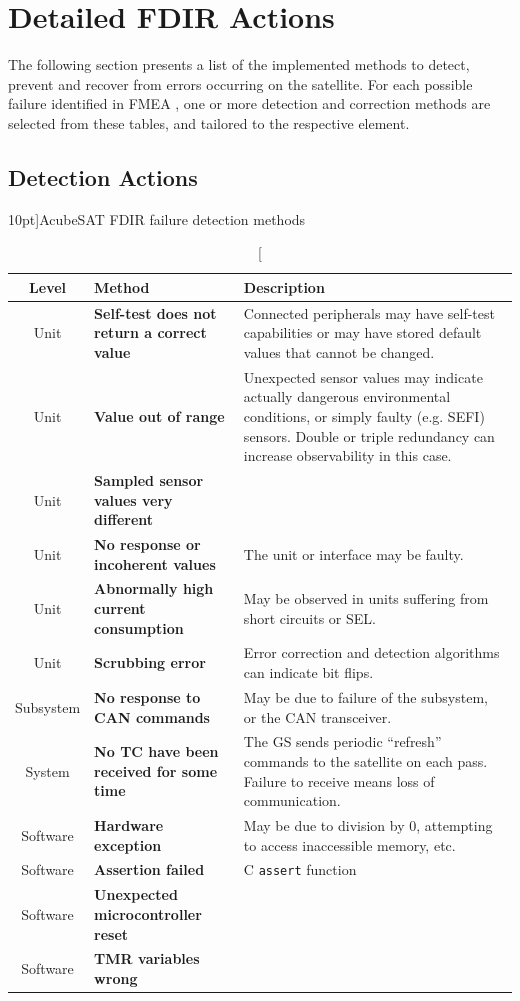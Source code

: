 \documentclass[a4paper,nobib]{tufte-book}
\begin{document}
\FloatBarrier
\section{Detailed \acs{FDIR} Actions}

The following section presents a list of the implemented methods to detect, prevent and recover from errors occurring on the satellite. For each possible failure identified in \acs{FMEA} \autocite{retselis_acubesat_fmea_2020}, one or more detection and correction methods are selected from these tables, and tailored to the respective element.


\clearpage
\subsection{Detection Actions}
\begin{table}[h]
	\centering
	\caption[][10pt]{AcubeSAT \acs{FDIR} failure detection methods}
	\label{tab:fdir_detect}
	\renewcommand{\arraystretch}{1.3}
	\begin{tabularx}{\textwidth}{@{}cL{5cm}X@{}}
		\toprule
		Level & Method & Description \\ \midrule
		Unit & \textbf{Self-test does not return a correct value} & Connected peripherals may have self-test capabilities or may have stored default values that cannot be changed. \\
		Unit & \textbf{Value out of range} & Unexpected sensor values may indicate actually dangerous environmental conditions, or simply faulty (e.g. \acs{SEFI}) sensors. Double or triple redundancy can increase observability in this case. \\
		Unit & \textbf{Sampled sensor values very different} & \\
		Unit & \textbf{No response or incoherent values} & The unit or interface may be faulty. \\
		Unit & \textbf{Abnormally high current consumption} & May be observed in units suffering from short circuits or \acs{SEL}. \\
		Unit & \textbf{Scrubbing error} & Error correction and detection algorithms can indicate bit flips. \\
		Subsystem & \textbf{No response to \acs{CAN} commands} & May be due to failure of the subsystem, or the \acs{CAN} transceiver. \\
		System & \textbf{No \acs{TC} have been received for some time} & The \acs{GS} sends periodic ``refresh'' commands to the satellite on each pass. Failure to receive means loss of communication. \\
		Software & \textbf{Hardware exception} & May be due to division by 0, attempting to access inaccessible memory, etc. \\
		Software & \textbf{Assertion failed} & C \texttt{assert} function \\
		Software & \textbf{Unexpected microcontroller reset} & \\
		Software & \textbf{\acs{TMR} variables wrong} & \\ \bottomrule
	\end{tabularx}
\end{table}
\end{document}
